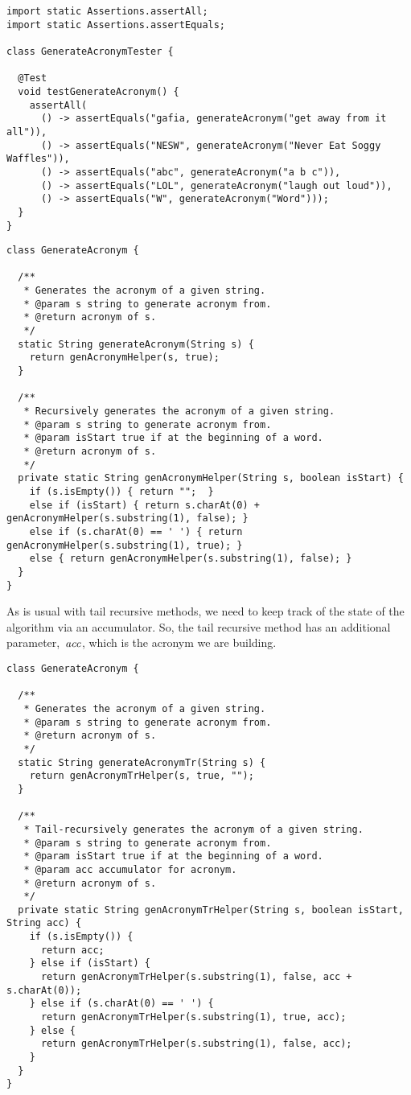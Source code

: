 \enlargethispage{2\baselineskip}
\begin{lstlisting}[language=MyJava]
import static Assertions.assertAll;
import static Assertions.assertEquals;

class GenerateAcronymTester {

  @Test
  void testGenerateAcronym() {
    assertAll(
      () -> assertEquals("gafia, generateAcronym("get away from it all")),
      () -> assertEquals("NESW", generateAcronym("Never Eat Soggy Waffles")),
      () -> assertEquals("abc", generateAcronym("a b c")),
      () -> assertEquals("LOL", generateAcronym("laugh out loud")),
      () -> assertEquals("W", generateAcronym("Word")));
  }
}
\end{lstlisting}

\begin{lstlisting}[language=MyJava]
class GenerateAcronym {

  /**
   * Generates the acronym of a given string.
   * @param s string to generate acronym from.
   * @return acronym of s.
   */
  static String generateAcronym(String s) { 
    return genAcronymHelper(s, true); 
  }

  /**
   * Recursively generates the acronym of a given string.
   * @param s string to generate acronym from.
   * @param isStart true if at the beginning of a word.
   * @return acronym of s.
   */
  private static String genAcronymHelper(String s, boolean isStart) {
    if (s.isEmpty()) { return "";  } 
    else if (isStart) { return s.charAt(0) + genAcronymHelper(s.substring(1), false); } 
    else if (s.charAt(0) == ' ') { return genAcronymHelper(s.substring(1), true); } 
    else { return genAcronymHelper(s.substring(1), false); }
  }
}
\end{lstlisting}

As is usual with tail recursive methods, we need to keep track of the state of the algorithm via an accumulator.
So, the tail recursive method has an additional parameter,~$\emph{acc}$, which is the acronym we are building.

\begin{lstlisting}[language=MyJava]
class GenerateAcronym {

  /**
   * Generates the acronym of a given string.
   * @param s string to generate acronym from.
   * @return acronym of s.
   */
  static String generateAcronymTr(String s) {
    return genAcronymTrHelper(s, true, "");
  }

  /**
   * Tail-recursively generates the acronym of a given string.
   * @param s string to generate acronym from.
   * @param isStart true if at the beginning of a word.
   * @param acc accumulator for acronym.
   * @return acronym of s.
   */
  private static String genAcronymTrHelper(String s, boolean isStart, String acc) {
    if (s.isEmpty()) { 
      return acc; 
    } else if (isStart) { 
      return genAcronymTrHelper(s.substring(1), false, acc + s.charAt(0)); 
    } else if (s.charAt(0) == ' ') { 
      return genAcronymTrHelper(s.substring(1), true, acc); 
    } else { 
      return genAcronymTrHelper(s.substring(1), false, acc); 
    }
  }
}
\end{lstlisting}

